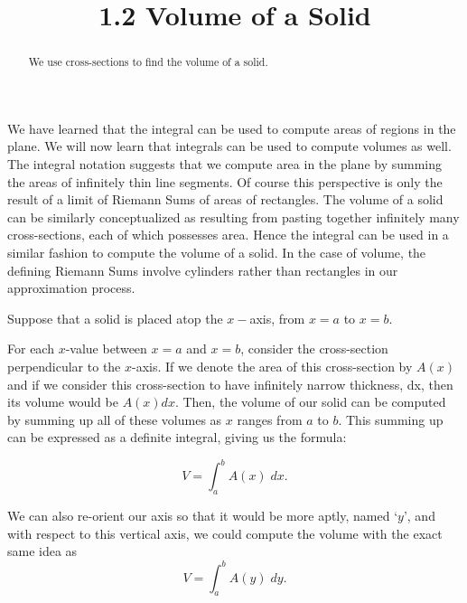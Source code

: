 \documentclass{ximera}
\title{1.2 Volume of a Solid}
\begin{document}
\begin{abstract}
We use cross-sections to find the volume of a solid.
\end{abstract}

\maketitle


We have learned that the integral can be used to compute areas of regions in the plane.  
We will now learn that integrals can be used to compute volumes as well.
The integral notation suggests that we compute area in the plane by summing the areas of  infinitely thin line segments.
Of course this perspective is only the result of a limit of Riemann Sums of areas of rectangles.
The volume of a solid can be similarly conceptualized as resulting from pasting together infinitely many cross-sections,
each of which possesses area. Hence the integral can be used in a similar fashion to compute the volume of a solid.
In the case of volume, the defining Riemann Sums involve cylinders rather than rectangles
in our approximation process.



Suppose that a solid is placed atop the $x-$axis, from $x = a$ to $x = b$.


For each $x$-value between $x = a$ and $x = b$,  consider the cross-section perpendicular to the $x$-axis. If we denote the area of this cross-section by 
 $A(x)$ and if we consider this cross-section to have infinitely narrow thickness, dx, then its volume would be $A(x) dx$.
Then, the volume of our solid can be computed by summing up all of these volumes as $x$ ranges from $a$ to $b$.
This summing up can be expressed as a definite integral, giving us the formula:

\[
V = \int_a^b A(x) \; dx.
\]




\begin{remark}
We can also re-orient our axis so that it would be more aptly, named `$y$', and with respect to this vertical axis, 
we could compute the volume with the exact same idea as
\[
V = \int_a^b A(y) \; dy.
\]

\end{remark}
\end{document}
